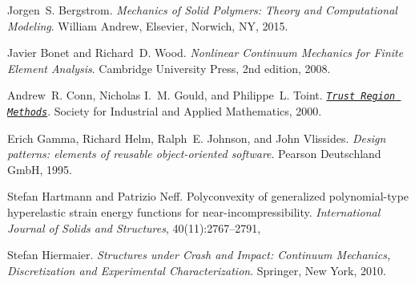 
\begin{DoxyDescription}
\item[\label{a03116_CITEREF_bergstromMechanicsSolidPolymers2015}%
\Hypertarget{a03116_CITEREF_bergstromMechanicsSolidPolymers2015}%
\mbox{[}1\mbox{]}]Jorgen~S. Bergstrom. {\itshape Mechanics of Solid Polymers\+: Theory and Computational Modeling}. William Andrew, Elsevier, Norwich, NY, 2015.


\item[\label{a03116_CITEREF_bonet2008nonlinear}%
\Hypertarget{a03116_CITEREF_bonet2008nonlinear}%
\mbox{[}2\mbox{]}]Javier Bonet and Richard~D. Wood. {\itshape Nonlinear Continuum Mechanics for Finite Element Analysis}. Cambridge University Press, 2nd edition, 2008. 


\item[\label{a03116_CITEREF_trustregion}%
\Hypertarget{a03116_CITEREF_trustregion}%
\mbox{[}3\mbox{]}]Andrew~R. Conn, Nicholas I.~M. Gould, and Philippe~L. Toint. \href{https://epubs.siam.org/doi/abs/10.1137/1.9780898719857}{\texttt{ {\itshape Trust Region Methods}}}. Society for Industrial and Applied Mathematics, 2000. 


\item[\label{a03116_CITEREF_gamma1995design}%
\Hypertarget{a03116_CITEREF_gamma1995design}%
\mbox{[}4\mbox{]}]Erich Gamma, Richard Helm, Ralph~E. Johnson, and John Vlissides. {\itshape Design patterns\+: elements of reusable object-\/oriented software}. Pearson Deutschland GmbH, 1995.


\item[\label{a03116_CITEREF_hartmann_polyconvexity_2003}%
\Hypertarget{a03116_CITEREF_hartmann_polyconvexity_2003}%
\mbox{[}5\mbox{]}]Stefan Hartmann and Patrizio Neff. Polyconvexity of generalized polynomial-\/type hyperelastic strain energy functions for near-\/incompressibility. {\itshape International Journal of Solids and Structures}, 40(11)\+:2767--2791,
\begin{DoxyEnumerate}
\item 
\end{DoxyEnumerate}


\item[\label{a03116_CITEREF_hiermaierStructuresCrashImpact2010}%
\Hypertarget{a03116_CITEREF_hiermaierStructuresCrashImpact2010}%
\mbox{[}6\mbox{]}]Stefan Hiermaier. {\itshape Structures under Crash and Impact\+: Continuum Mechanics, Discretization and Experimental Characterization}. Springer, New York, 2010.


\end{DoxyDescription}